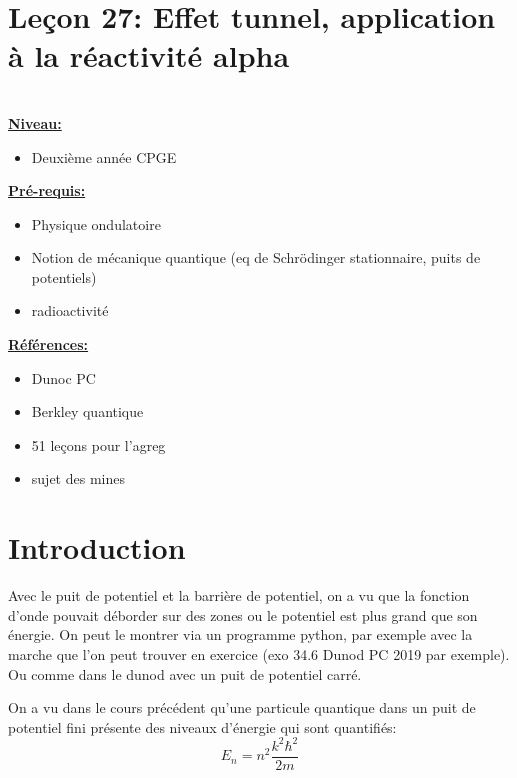 \documentclass[french, a4paper, 10pt, twocolumn, landscape]{article}
\begin{document}
\section*{Leçon 27: Effet tunnel, application à la réactivité alpha}

\hrulefill\\

\noindent\underline{\textbf{Niveau:}} 
\begin{itemize}
    \item Deuxième année CPGE
\end{itemize}

\noindent\underline{\textbf{Pré-requis:}}
\begin{itemize}
    \item Physique ondulatoire
    \item Notion de mécanique quantique (eq de Schrödinger stationnaire, puits de potentiels)
    \item radioactivité
\end{itemize}

\noindent\underline{\textbf{Références:}}

\begin{itemize}
    \item Dunoc PC 
    \item Berkley quantique
    \item 51 leçons pour l'agreg
    \item sujet des mines
\end{itemize}

\hrulefill


\section*{Introduction}

Avec le puit de potentiel et la barrière de potentiel, on a vu que la fonction d'onde pouvait déborder sur des zones ou le potentiel est plus grand que son énergie. On peut le montrer via un programme python, par exemple avec la marche que l'on peut trouver en exercice (exo 34.6 Dunod PC 2019 par exemple). Ou comme dans le dunod avec un puit de potentiel carré.\medskip

On a vu dans le cours précédent qu'une particule quantique dans un puit de potentiel fini présente des niveaux d'énergie qui sont quantifiés:
\begin{equation}
    E_n = n^2\dfrac{k^2\hbar^2}{2m}
\end{equation}
\end{document}
